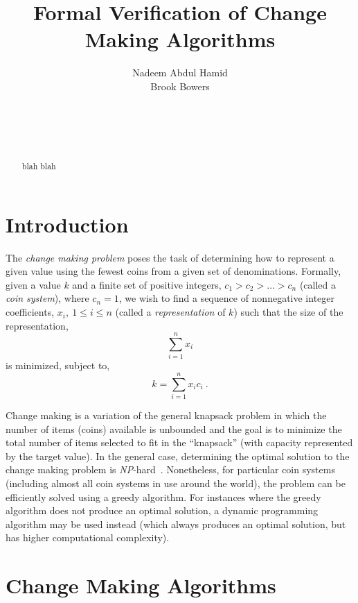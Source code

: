 \documentclass{acm_proc_article-sp}
\title{Formal Verification of Change Making Algorithms}
\author{
\alignauthor
Nadeem Abdul Hamid\\
  \email{nadeem@acm.org}
\alignauthor
Brook Bowers\\
  \email{brook.bowers@vikings.berry.edu}
\and
  \affaddr{Berry College} \\
   \affaddr{Department of Mathematics and Computer Science}\\
  \affaddr{Mount Berry, GA 30149}\\
}
\begin{document}
\maketitle

\begin{abstract}
blah blah
\end{abstract}




\section{Introduction}

The \emph{change making problem} poses the task of determining how to represent a given value using the fewest coins from a given set of denominations. Formally, given a value $k$ and a finite set of positive integers, $c_1 > c_2 > \ldots > c_n$ (called a \emph{coin system}), where $c_n = 1$, we wish to find a sequence of nonnegative integer coefficients, $x_i,\ 1 \le i \le n$ (called a \emph{representation} of $k$) such that the size of the representation,
\[ \sum_{i=1}^{n}x_i \]
is minimized, subject to,
\[ k = \sum_{i=1}^{n}{x_i c_i}\ . \]

Change making is a variation of the general knapsack problem in which the number of items (coins) available is unbounded and the goal is to minimize the total number of items selected to fit in the ``knapsack'' (with capacity represented by the target value). In the general case, determining the optimal solution to the change making problem is \emph{NP}-hard~\cite{?}. Nonetheless, for particular coin systems (including almost all coin systems in use around the world), the problem can be efficiently solved using a greedy algorithm. For instances where the greedy algorithm does not produce an optimal solution, a dynamic programming algorithm may be used instead (which always produces an optimal solution, but has higher computational complexity).


\section{Change Making Algorithms}
\end{document}
